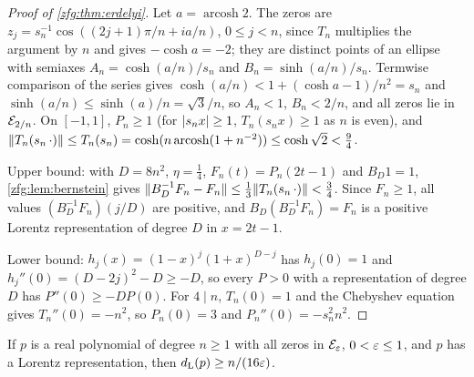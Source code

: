\begin{proof}[Proof of \cref{zfg:thm:erdelyi}]
Let $a=\operatorname{arcosh}2$. The zeros are $z_j=s_n^{-1}\cos((2j+1)\pi/n+ia/n)$, $0\le j<n$, since $T_n$ multiplies the argument by $n$
and gives $-\cosh a=-2$; they are distinct points of an ellipse with semiaxes $A_n=\cosh(a/n)/s_n$ and $B_n=\sinh(a/n)/s_n$.
Termwise comparison of the series gives $\cosh(a/n)<1+(\cosh a-1)/n^2=s_n$ and $\sinh(a/n)\le\sinh(a)/n=\sqrt3/n$, so $A_n<1$,
$B_n<2/n$, and all zeros lie in $\mathcal E_{2/n}$. On $[-1,1]$, $P_n\ge1$ (for $\lvert s_nx\rvert\ge1$, $T_n(s_nx)\ge1$ as $n$ is even), and
$\lVert T_n(s_n\,\cdot)\rVert\le T_n(s_n)=\cosh(n\operatorname{arcosh}(1+n^{-2}))\le\cosh\sqrt2<\tfrac94$.

Upper bound: with $D=8n^2$, $\eta=\tfrac14$, $F_n(t)=P_n(2t-1)$ and $B_D1=1$, \cref{zfg:lem:bernstein} gives
$\lVert B_D^{-1}F_n-F_n\rVert\le\tfrac13\lVert T_n(s_n\,\cdot)\rVert<\tfrac34$. Since $F_n\ge1$, all values $(B_D^{-1}F_n)(j/D)$ are positive, and
$B_D(B_D^{-1}F_n)=F_n$ is a positive Lorentz representation of degree $D$ in $x=2t-1$.

Lower bound: $h_j(x)=(1-x)^j(1+x)^{D-j}$ has $h_j(0)=1$ and $h_j''(0)=(D-2j)^2-D\ge-D$, so every $P>0$ with a representation of
degree $D$ has $P''(0)\ge-DP(0)$. For $4\mid n$, $T_n(0)=1$ and the Chebyshev equation gives $T_n''(0)=-n^2$, so $P_n(0)=3$ and
$P_n''(0)=-s_n^2n^2$.
\end{proof}

\begin{theorem}\label{zfg:thm:ellipselow}
If $p$ is a real polynomial of degree $n\ge1$ with all zeros in $\mathcal E_\varepsilon$, $0<\varepsilon\le1$, and $p$ has a Lorentz representation,
then $d_{\mathrm L}(p)\ge n/(16\varepsilon)$.
\end{theorem}


